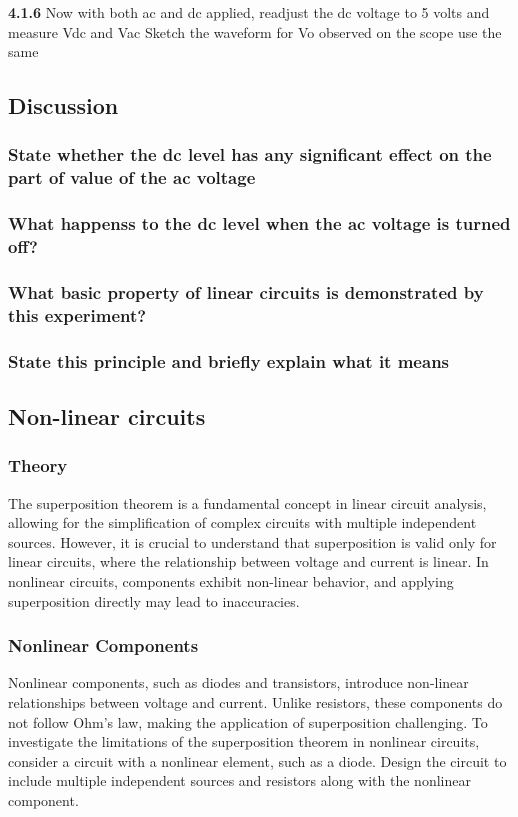 \textbf{4.1.6} Now with both ac and dc applied, readjust the dc voltage to 5 volts and measure Vdc and Vac Sketch the waveform for Vo observed on the scope use the same

\subsection{Discussion}
\subsubsection*{State whether  the dc level has any significant effect on the part of value of the ac voltage}
\subsubsection*{What happenss to the dc level when the ac voltage is turned off?}
\subsubsection*{What basic property of linear circuits is demonstrated by this experiment?}
\subsubsection*{State this principle and briefly explain what it means}

\subsection{Non-linear circuits}

\subsubsection*{Theory}
The superposition theorem is a fundamental concept in linear circuit analysis, allowing for the simplification of complex circuits with multiple independent sources. However, it is crucial to understand that superposition is valid only for linear circuits, where the relationship between voltage and current is linear. In nonlinear circuits, components exhibit non-linear behavior, and applying superposition directly may lead to inaccuracies.
\subsubsection*{Nonlinear Components}
Nonlinear components, such as diodes and transistors, introduce non-linear relationships between voltage and current. Unlike resistors, these components do not follow Ohm's law, making the application of superposition challenging.
To investigate the limitations of the superposition theorem in nonlinear circuits, consider a circuit with a nonlinear element, such as a diode. Design the circuit to include multiple independent sources and resistors along with the nonlinear component.
